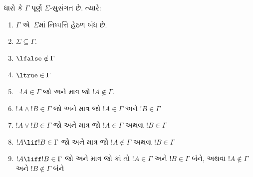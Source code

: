 \begin{prop}
  ધારો કે $\Gamma$ પૂર્ણ $\Sigma$-સુસંગત છે. ત્યારે:
  \begin{enumerate}
  \item {}%
    $\Gamma$ એ~$\Sigma$માં નિષ્પત્તિ હેઠળ બંધ છે.
  \item {}%
    $\Sigma \subseteq \Gamma$.
  \item {}%
    $\lfalse \notin \Gamma$
  \item {}%
    $\ltrue \in \Gamma$
  \item {}%
    $\lnot!A \in \Gamma$ જો અને માત્ર જો $!A \notin
    \Gamma$.
  \item {}%
    $!A \land !B \in \Gamma$ જો અને માત્ર જો $!A \in \Gamma$ અને
    $!B \in \Gamma$
  \item {}%
    $!A \lor !B \in \Gamma$ જો અને માત્ર જો $!A \in \Gamma$ અથવા
    $!B \in \Gamma$
  \item {}%
    $!A \lif !B \in \Gamma$ જો અને માત્ર જો $!A \notin \Gamma$
    અથવા $!B \in \Gamma$
  \item {}%
    $!A \liff !B \in \Gamma$ જો અને માત્ર જો કાં તો $!A \in \Gamma$
    અને $!B \in \Gamma$ બંને, અથવા $!A \notin \Gamma$ અને
    $!B \notin \Gamma$ બંને
  \end{enumerate}
\end{prop}

